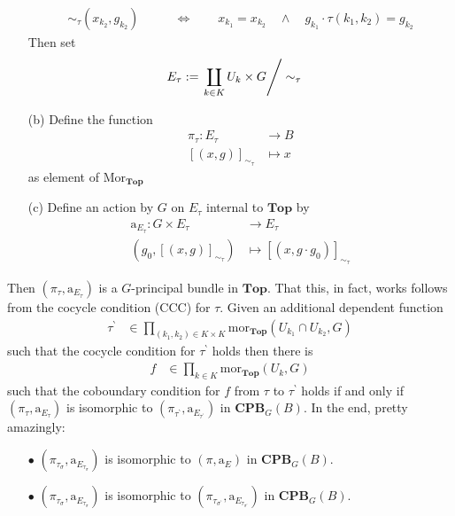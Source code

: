 \begin{exa}[Bundles 2]
\begin{enumerate}
\begin{align*}
  \sim_{\tau}
  (x_{k_{2}},g_{k_{2}})
  \qquad
  &\Leftrightarrow
  \qquad
  x_{k_{1}}
  =
  x_{k_{2}}
  \quad
  \land
  \quad
  g_{k_{1}}
  \cdot
  \tau(k_{1},k_{2})
  =
  g_{k_{2}}
\end{align*}
Then set
\begin{align*}
  E_{\tau}
  &:=
  \left.
    \coprod_{k \in K}
    U_{k}
    \times
    G
  \right\slash
  \sim_{\tau}
\end{align*}
\item[(b)]
Define the function
\begin{align*}
  \pi_{\tau}
  \colon
  E_{\tau}
  &\rightarrow
  B
  \\
  [(x,g)]_{\sim_{\tau}}
  &\mapsto
  x
\end{align*}
as element of $\mathrm{Mor}_{\mathbf{Top}}$
\item[(c)]
Define an action by $G$ on $E_{\tau}$ internal to $\mathbf{Top}$ by
\begin{align*}
  \mathrm{a}_{E_{\tau}}
  \colon
  G
  \times
  E_{\tau}
  &\rightarrow
  E_{\tau}
  \\
  (g_{0},[(x,g)]_{\sim_{\tau}})
  &\mapsto
  [(x,g \cdot g_{0})]_{\sim_{\tau}}
\end{align*}
\end{enumerate}
Then $(\pi_{\tau},\mathrm{a}_{E_{\tau}})$ is a $G$-principal bundle in $\mathbf{Top}$. That this, in fact, works follows from the cocycle condition (CCC) for $\tau$. Given an additional dependent function
\begin{align*}
  \tau^{\backprime}
  &\in
  \prod_{(k_{1},k_{2}) \in K \times K}
  \mathrm{mor}_{\mathbf{Top}}(U_{k_{1}} \cap U_{k_{2}},G)
\end{align*}
such that the cocycle condition for $\tau^{\backprime}$ holds then there is
\begin{align*}
  f
  &\in
  \prod_{k \in K}
  \mathrm{mor}_{\mathbf{Top}}(U_{k},G)
\end{align*}
such that the coboundary condition for $f$ from $\tau$ to $\tau^{\backprime}$ holds if and only if $(\pi_{\tau},\mathrm{a}_{E_{\tau}})$ is isomorphic to $(\pi_{\tau^{\backprime}},\mathrm{a}_{E_{\tau^{\backprime}}})$ in $\mathbf{CPB}_{G}(B)$. In the end, pretty amazingly:
\begin{enumerate}
\item[$\bullet$]
$(\pi_{\tau_{\sigma}},\mathrm{a}_{E_{\tau_{\sigma}}})$ is isomorphic to $(\pi,\mathrm{a}_{E})$ in $\mathbf{CPB}_{G}(B)$.
\item[$\bullet$]
$(\pi_{\tau_{\sigma}},\mathrm{a}_{E_{\tau_{\sigma}}})$ is isomorphic to $(\pi_{\tau_{\sigma^{\backprime}}},\mathrm{a}_{E_{\tau_{\sigma^{\backprime}}}})$ in $\mathbf{CPB}_{G}(B)$.

\end{enumerate}
\end{exa}
